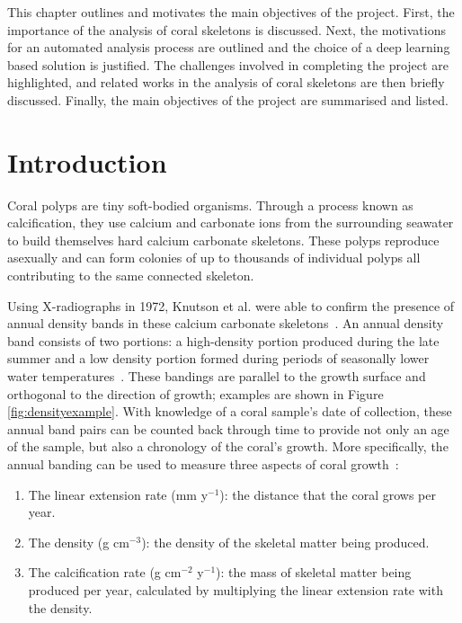 This chapter outlines and motivates the main objectives of the project. First, the importance of the analysis of coral skeletons is discussed. Next, the motivations for an automated analysis process are outlined and the choice of a deep learning based solution is justified. The challenges involved in completing the project are highlighted, and related works in the analysis of coral skeletons are then briefly discussed. Finally, the main objectives of the project are summarised and listed.

\section{Introduction}

Coral polyps are tiny soft-bodied organisms. Through a process known as calcification, they use calcium and carbonate ions from the surrounding seawater to build themselves hard calcium carbonate skeletons. These polyps reproduce asexually and can form colonies of up to thousands of individual polyps all contributing to the same connected skeleton.

Using X-radiographs in 1972, Knutson et al. were able to confirm the presence of annual density bands in these calcium carbonate skeletons~\cite{knutson}. An annual density band consists of two portions: a high-density portion produced during the late summer and a low density portion formed during periods of seasonally lower water temperatures~\cite{highlow}. These bandings are parallel to the growth surface and orthogonal to the direction of growth; examples are shown in Figure \ref{fig:densityexample}. With knowledge of a coral sample's date of collection, these annual band pairs can be counted back through time to provide not only an age of the sample, but also a chronology of the coral's growth. More specifically, the annual banding can be used to measure three aspects of coral growth~\cite{lough2011new}:

\begin{enumerate}
    \item The linear extension rate (mm y$^{-1}$): the distance that the coral grows per year.
    \item The density (g cm$^{-3}$): the density of the skeletal matter being produced.
    \item The calcification rate (g cm$^{-2}$ y$^{-1}$): the mass of skeletal matter being produced per year, calculated by multiplying the linear extension rate with the density.
\end{enumerate}

